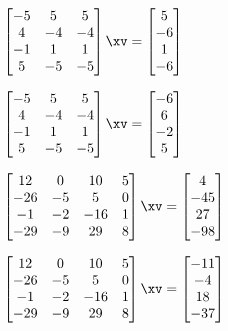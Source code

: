 \begin{exercise}
\begin{Parts}
\begin{OmitV1}
\item \(\begin{bmatrix} -5&5&5
\\4&-4&-4
\\-1&1&1
\\5&-5&-5 \end{bmatrix}\xv
=\begin{bmatrix} 5\\-6\\1\\-6 \end{bmatrix}\)

\item \(\begin{bmatrix} -5&5&5
\\4&-4&-4
\\-1&1&1
\\5&-5&-5 \end{bmatrix}\xv
=\begin{bmatrix} -6\\6\\-2\\5 \end{bmatrix}\)
\end{OmitV1}

\item \(\begin{bmatrix} 12&0&10&5
\\-26&-5&5&0
\\-1&-2&-16&1
\\-29&-9&29&8 \end{bmatrix}\xv
=\begin{bmatrix}  4\\-45\\27\\-98 \end{bmatrix}\)

\item \(\begin{bmatrix} 12&0&10&5
\\-26&-5&5&0
\\-1&-2&-16&1
\\-29&-9&29&8 \end{bmatrix}\xv
=\begin{bmatrix} -11\\-4\\18\\-37 \end{bmatrix}\)


\end{Parts}
\end{exercise}
